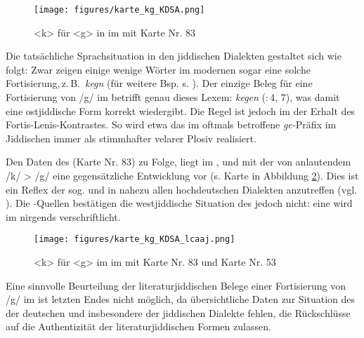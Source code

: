 {  \begin{figure}
		\centering
\texttt{[image: figures/karte\_kg\_KDSA.png]}
		\caption{\label{kartekgkdsa} <k> für <g> in  im  mit  Karte Nr. 83}
		\end{figure}

		
		
Die tatsächliche Sprachsituation in den jiddischen Dialekten gestaltet sich wie folgt: Zwar zeigen einige wenige Wörter im modernen \hai{{\OJ}} sogar eine solche Fortisierung,\,z.\,B.\,  \textit{kegn}  (für weitere Bsp. s. \citealt[373]{Bin-Nun1973}). Der einzige Beleg für eine Fortisierung von /g/ im  betrifft genau dieses Lexem: \textit{kegen}  (:\,4, 7), was damit eine ostjiddische Form korrekt wiedergibt. Die Regel ist jedoch im \hai{{\OJ}} der Erhalt des Fortis-Lenis-Kontrastes.  So wird etwa das im \hai{{\LiJi}} oftmals betroffene \textit{ge-}Präfix im Jiddischen immer als stimmhafter velarer Plosiv realisiert.  

Den Daten des  (Karte Nr. 83) zu Folge, liegt im , \hai{{\SWJ}} und {\ndl} \hai{{\NWJ}} mit der  von anlautendem /k/ > /g/ eine gegensätzliche Entwicklung vor (s. Karte in Abbildung \ref{kartekgkdsalcaaj}). Dies ist ein Reflex der sog.  und in nahezu allen hochdeutschen Dialekten anzutreffen (vgl.\, \citealt[332]{Schirmunski1962}). Die \hai{{\LiJi}}-Quellen bestätigen die westjiddische Situation des  jedoch nicht: eine  wird im \hai{{\LiJi}} nirgends verschriftlicht.
		
		
		  \begin{figure}
		\centering
\texttt{[image: figures/karte\_kg\_KDSA\_lcaaj.png]}
		\caption{\label{kartekgkdsalcaaj} <k> für <g> im   im  mit  Karte Nr. 83 und  Karte Nr. 53}
		\end{figure}



Eine sinnvolle Beurteilung der literaturjiddischen Belege einer Fortisierung von /g/ im  ist letzten Endes nicht möglich, da übersichtliche Daten zur Situation des  der deutschen und insbesondere der jiddischen Dialekte fehlen, die Rückschlüsse auf die Authentizität der literaturjiddischen Formen zulassen.
 
}
